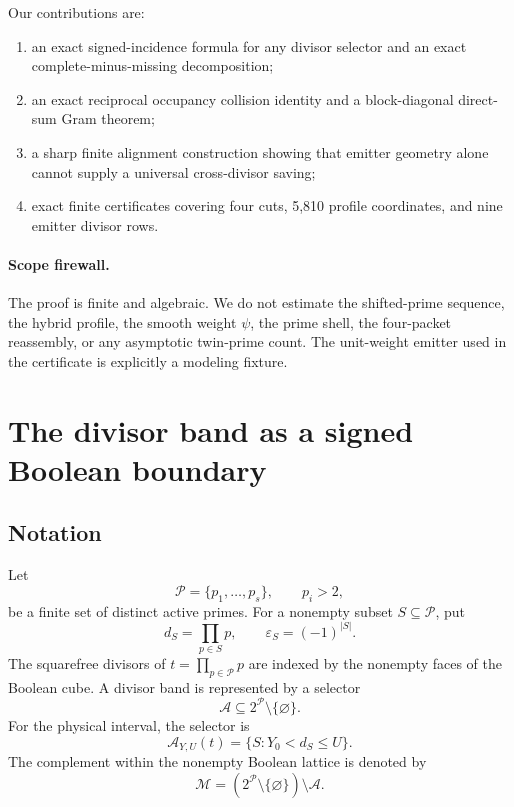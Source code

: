 \documentclass[11pt]{article}
\theoremstyle{definition}
\theoremstyle{remark}
\newcommand{\PP}{\mathcal P}
\newcommand{\Aset}{\mathcal A}
\newcommand{\MM}{\mathcal M}
\begin{document}
Our contributions are:
\begin{enumerate}[leftmargin=2em]
 \item an exact signed-incidence formula for any divisor selector and an exact
       complete-minus-missing decomposition;
 \item an exact reciprocal occupancy collision identity and a block-diagonal
       direct-sum Gram theorem;
 \item a sharp finite alignment construction showing that emitter geometry alone
       cannot supply a universal cross-divisor saving;
 \item exact finite certificates covering four cuts, 5,810 profile coordinates,
       and nine emitter divisor rows.
\end{enumerate}

\paragraph{Scope firewall.}
The proof is finite and algebraic.  We do not estimate the shifted-prime sequence,
the hybrid profile, the smooth weight $\psi$, the prime shell, the four-packet
reassembly, or any asymptotic twin-prime count.  The unit-weight emitter used in
the certificate is explicitly a modeling fixture.

\section{The divisor band as a signed Boolean boundary}

\subsection{Notation}

Let
\[
 \PP=\{p_1,\ldots,p_s\},\qquad p_i>2,
\]
be a finite set of distinct active primes.  For a nonempty subset
$S\subseteq\PP$, put
\[
 d_S=\prod_{p\in S}p,\qquad \varepsilon_S=(-1)^{|S|}.
\]
The squarefree divisors of $t=\prod_{p\in\PP}p$ are indexed by the nonempty
faces of the Boolean cube.  A divisor band is represented by a selector
\[
 \Aset\subseteq 2^{\PP}\setminus\{\varnothing\}.
\]
For the physical interval, the selector is
\begin{equation}
 \Aset_{Y,U}(t)=\{S:Y_0<d_S\leq U\}.
 \label{eq:band-selector}
\end{equation}
The complement within the nonempty Boolean lattice is denoted by
\[
 \MM=(2^{\PP}\setminus\{\varnothing\})\setminus\Aset.
\]
\end{document}
